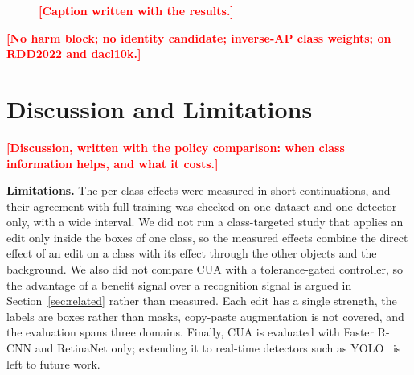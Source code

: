 \documentclass[conference]{IEEEtran}
\newcommand{\todo}[1]{\textcolor{red}{\textbf{[#1]}}}
\begin{document}
\begin{figure}[t]
\centering
{}
\caption{\todo{Caption written with the results.}}
\label{fig:agreement}
\end{figure}

\begin{table}[t]
\caption{Ablations of CUA on Validation (Faster R-CNN, Three Seeds)}
\label{tab:ablations}
\centering
\footnotesize
\todo{No harm block; no identity candidate; inverse-AP class weights; on RDD2022 and dacl10k.}
\end{table}

\section{Discussion and Limitations}
\label{sec:discussion}

\todo{Discussion, written with the policy comparison: when class information helps, and what it costs.}

\noindent\textbf{Limitations.} The per-class effects were measured in short continuations, and their agreement with full training was checked on one dataset and one detector only, with a wide interval. We did not run a class-targeted study that applies an edit only inside the boxes of one class, so the measured effects combine the direct effect of an edit on a class with its effect through the other objects and the background. We also did not compare CUA with a tolerance-gated controller, so the advantage of a benefit signal over a recognition signal is argued in Section~\ref{sec:related} rather than measured. Each edit has a single strength, the labels are boxes rather than masks, copy-paste augmentation is not covered, and the evaluation spans three domains. Finally, CUA is evaluated with Faster R-CNN and RetinaNet only; extending it to real-time detectors such as YOLO~\cite{bochkovskiy2020yolov4} is left to future work.




\end{document}
